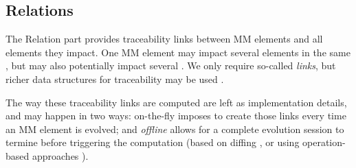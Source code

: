 \subsection{Relations}
\label{sec:Suggestion:Relation}

The \textsf{Relation} part provides traceability links between \textsf{MM}
elements and all \viewtype elements they impact. One \textsf{MM} element
may impact several elements in the same \viewtype, but may also potentially
impact several \viewtypes. We only require so-called \emph{links}, but richer
data structures for traceability may be used \autocite{Batot-Cabot-Gerard:2021}.

The way these traceability links are computed are left as implementation
details, and may happen in two ways: \textsf{on-the-fly} imposes to create
those links every time an \textsf{MM} element is evolved; and \emph{offline}
allows for a complete evolution session to termine before triggering the
computation (based on diffing \autocite{Kehrer-Kelter-Taentzer:2011}, or using 
operation-based approaches \parencite{J:Lippe-Oosterom:1992}).
